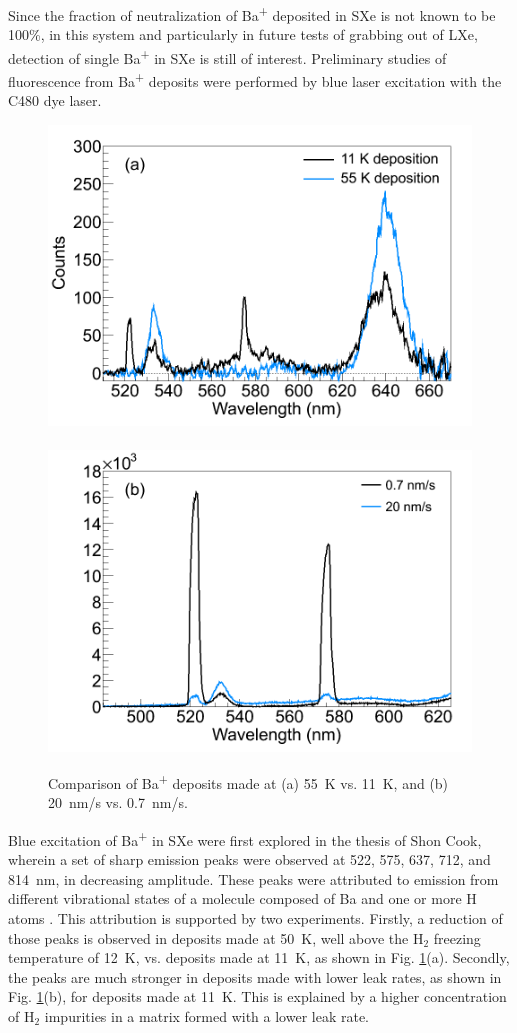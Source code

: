 Since the fraction of neutralization of Ba\textsuperscript{+} deposited in SXe is not known to be 100\%, in this system and particularly in future tests of grabbing out of LXe, detection of single Ba\textsuperscript{+} in SXe is still of interest.  Preliminary studies of fluorescence from Ba\textsuperscript{+} deposits were performed by blue laser excitation with the C480 dye laser.

\begin{figure} %
        \centering
                \includegraphics[width=.5\textwidth]{figures/BaHx_a.png}
                ~
                \includegraphics[width=.5\textwidth]{figures/BaHx_b.png}
                \caption{Comparison of Ba\textsuperscript{+} deposits made at (a) 55~K vs. 11~K, and (b) 20~nm/s vs. 0.7~nm/s.\cite{Mong2015}}
\label{fig:BaHx}
\end{figure}

Blue excitation of Ba\textsuperscript{+} in SXe were first explored in the thesis of Shon Cook, wherein a set of sharp emission peaks were observed at 522, 575, 637, 712, and 814~nm, in decreasing amplitude.  These peaks were attributed to emission from different vibrational states of a molecule composed of Ba and one or more H atoms \cite{Shon}.  This attribution is supported by two experiments.  Firstly, a reduction of those peaks is observed in deposits made at 50~K, well above the H$_{2}$ freezing temperature of 12~K, vs. deposits made at 11~K, as shown in Fig. \ref{fig:BaHx}(a).  Secondly, the peaks are much stronger in deposits made with lower leak rates, as shown in Fig. \ref{fig:BaHx}(b), for deposits made at 11~K.  This is explained by a higher concentration of H$_{2}$ impurities in a matrix formed with a lower leak rate.

